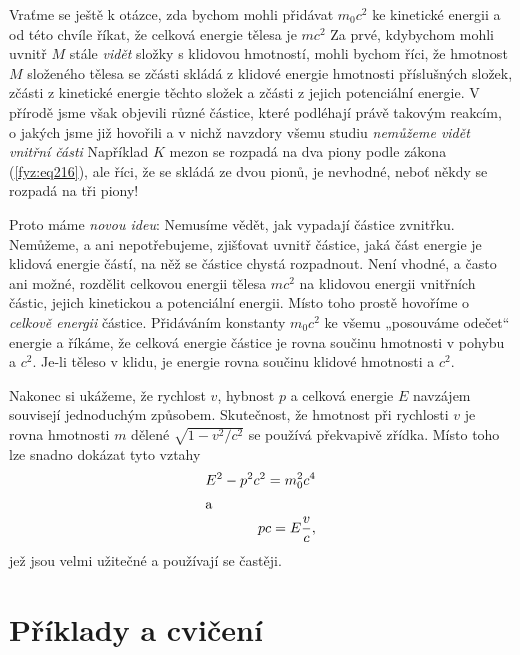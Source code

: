     Vraťme se ještě k otázce, zda bychom mohli přidávat \(m_0c^2\) ke kinetické energii a od této 
    chvíle říkat, že celková energie tělesa je \(mc^2\) Za prvé, kdybychom mohli uvnitř \(M\) stále 
    \emph{vidět} složky s klidovou hmotností, mohli bychom říci, že hmotnost \(M\) složeného tělesa 
    se zčásti skládá z klidové energie hmotnosti příslušných složek, zčásti z kinetické energie 
    těchto složek a zčásti z jejich potenciální energie. V přírodě jsme však objevili různé 
    částice, které podléhají právě takovým reakcím, o jakých jsme již hovořili a v nichž navzdory 
    všemu studiu \emph{nemůžeme vidět vnitřní části} Například \(K\) mezon se rozpadá na dva piony 
    podle zákona (\ref{fyz:eq216}), ale říci, že se skládá ze dvou pionů, je nevhodné, neboť někdy 
    se rozpadá na tři piony!
    
    Proto máme \emph{novou ideu}: Nemusíme vědět, jak vypadají částice zvnitřku. Nemůžeme, a ani 
    nepotřebujeme, zjišťovat uvnitř částice, jaká část energie je klidová energie částí, na něž se 
    částice chystá rozpadnout. Není vhodné, a často ani možné, rozdělit celkovou energii tělesa 
    \(mc^2\) na klidovou energii vnitřních částic, jejich kinetickou a potenciální energii. Místo 
    toho prostě hovoříme o \emph{celkově energii} částice. Přidáváním konstanty \(m_0c^2\) ke všemu 
    „posouváme odečet“ energie a říkáme, že celková energie částice je rovna součinu hmotnosti v 
    pohybu a \(c^2\). Je-li těleso v klidu, je energie rovna součinu klidové hmotnosti a \(c^2\).
    
    Nakonec si ukážeme, že rychlost \(v\), hybnost \(p\) a celková energie \(E\) navzájem souvisejí 
    jednoduchým způsobem. Skutečnost, že hmotnost při rychlosti \(v\) je rovna hmotnosti \(m\) 
    dělené \(\sqrt{ 1 - v^2/c^2}\) se používá překvapivě zřídka. Místo toho lze snadno dokázat tyto 
    vztahy
    \begin{align}
      E^2 - p^2c^2 = m_0^2c^4   \label{fyz:eq218}  \\
      \shortintertext{a}
      pc = E\frac{v}{c},        \label{fyz:eq219}
    \end{align}
    jež jsou velmi užitečné a používají se častěji. 
    
  \section{Příklady a cvičení}\label{fyz:IchapXVIsecVI}

